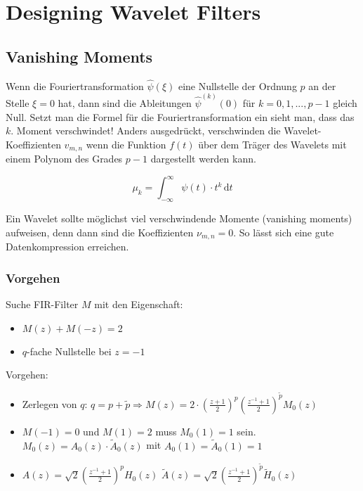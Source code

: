 \section{Designing Wavelet Filters}
\subsection{Vanishing Moments}
 Wenn die Fouriertransformation $\hat{\psi}(\xi)$ eine Nullstelle der Ordnung $p$ an der Stelle $\xi = 0$ hat, dann sind die Ableitungen $\hat{\psi}^{(k)}(0)$ für $k=0,1,...,p-1$ gleich Null. Setzt man die Formel für die Fouriertransformation ein sieht man, dass das $k$. Moment verschwindet! Anders ausgedrückt, verschwinden die Wavelet-Koeffizienten $v_{m,n}$ wenn die Funktion $f(t)$ über dem Träger des Wavelets mit einem Polynom des Grades $p-1$ dargestellt werden kann. 

\[ 
	\mu_k = \int_{-\infty}^{\infty} \psi(t) \cdot t^k \, \mathrm{d}t
\]

Ein Wavelet sollte möglichst viel verschwindende Momente (vanishing moments) aufweisen, denn dann sind die Koeffizienten $\nu_{m,n} = 0$. So lässt sich eine gute Datenkompression erreichen.


\subsubsection{Vorgehen}
Suche FIR-Filter $M$ mit den Eigenschaft: 

\vspace{-0.4cm}

\begin{itemize}
	\itemsep-0.2cm
	\item $M(z) + M(-z)=2$
	\item $q$-fache Nullstelle bei $z=-1$
\end{itemize}

Vorgehen:

\vspace{-0.4cm}

\begin{itemize}
	\itemsep-0.2cm
	\item Zerlegen von $q$: $q = p + \tilde{p} \Rightarrow M(z)=2\cdot (\frac{z+1}{2})^p (\frac{z^{-1}+1}{2})^{\tilde{p}}M_0(z)$
	\item $M(-1)=0$ und $M(1) = 2$ muss $M_0(1)=1$ sein. $M_0(z) = A_0(z) \cdot \tilde{A}_0(z)$ mit $A_0(1)=\tilde{A}_0(1) = 1$
	\item $A(z) = \sqrt{2}(\frac{z^{-1}+1}{2})^p H_0(z)$ \qquad $\tilde{A}(z) = \sqrt{2}(\frac{z^{-1}+1}{2})^{\tilde{p}} \tilde{H}_0(z)$
\end{itemize}

